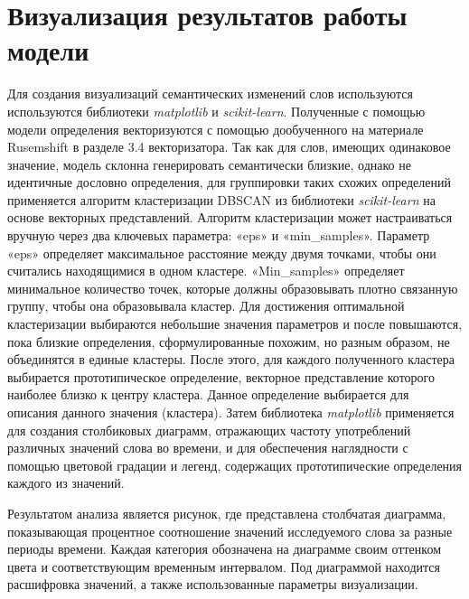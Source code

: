 \documentclass[LI,VKR]{HSEUniversity}
\begin{document}
\section{Визуализация результатов работы модели}

Для создания визуализаций семантических изменений слов используются используются библиотеки
\textit{matplotlib} и \textit{scikit-learn}.
Полученные с помощью модели определения векторизуются с помощью дообученного
на материале Rusemshift в разделе 3.4 векторизатора.
Так как для слов, имеющих одинаковое значение,
модель склонна генерировать семантически близкие, однако не идентичные дословно определения,
для группировки таких схожих определений применяется алгоритм кластеризации DBSCAN из
библиотеки \textit{scikit-learn} на основе векторных представлений.
Алгоритм кластеризации может настраиваться вручную через два ключевых параметра:
«eps» и «min\_samples».
Параметр «eps» определяет максимальное расстояние между двумя точками,
чтобы они считались находящимися в одном кластере.
«Min\_samples» определяет минимальное количество точек,
которые должны образовывать плотно связанную группу, чтобы она образовывала кластер.
Для достижения оптимальной кластеризации выбираются небольшие значения параметров и
после повышаются, пока близкие определения, сформулированные похожим, но разным образом,
не объединятся в единые кластеры.
После этого, для каждого полученного кластера выбирается прототипическое определение,
векторное представление которого наиболее близко к центру кластера.
Данное определение выбирается для описания данного значения (кластера).
Затем библиотека \textit{matplotlib} применяется для создания столбиковых диаграмм,
отражающих частоту употреблений различных значений слова во времени,
и для обеспечения наглядности с помощью цветовой градации и легенд,
содержащих прототипические определения каждого из значений.

Результатом анализа является рисунок, где представлена столбчатая диаграмма,
показывающая процентное соотношение значений исследуемого слова за разные периоды времени.
Каждая категория обозначена на диаграмме своим оттенком цвета и соответствующим временным интервалом.
Под диаграммой находится расшифровка значений, а также использованные параметры визуализации.
\end{document}
